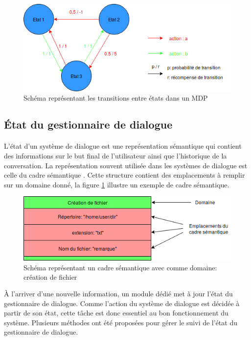 	\begin{figure}[H]
		\centering
		\includegraphics[width=.95\linewidth]{images/DM/MDP.png} 
		\caption{Schéma représentant les transitions entre états dans un MDP} 
	\end{figure}
	
	
	\subsection{État du gestionnaire de dialogue}
		\paragraph{}
		L’état d’un système de dialogue est une représentation sémantique qui contient des informations sur le but final de l’utilisateur ainsi que l’historique de la conversation. La représentation souvent utilisée dans les systèmes de dialogue est celle du cadre sémantique \cite{Chen2017}. Cette structure contient des emplacements à remplir sur un domaine donné, la figure \ref{SFrame} illustre un exemple de cadre sémantique.\newline
		
		\begin{figure}[H]
			\centering
			\includegraphics[width=.7\linewidth]{images/DM/SFrame.png} 
			\caption{Schéma représentant un cadre sémantique avec comme domaine: création de fichier} 
			\label{SFrame}
		\end{figure}


À l’arriver d’une nouvelle information, un module dédié met à jour l’état du gestionnaire de dialogue. Comme l’action du système de dialogue est décidée à partir de son état, cette tâche est donc essentiel au bon fonctionnement du système. Plusieurs méthodes ont été proposées pour gérer le suivi de l’état du gestionnaire de dialogue.
